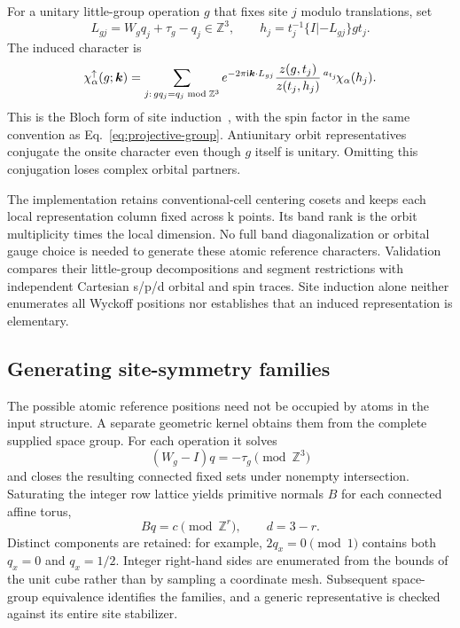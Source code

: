 For a unitary little-group operation $g$ that fixes site $j$ modulo
translations, set
\begin{equation}
 L_{gj}=W_gq_j+\tau_g-q_j\in\mathbb Z^3,\qquad
 h_j=t_j^{-1}\{I|-L_{gj}\}g t_j .
\end{equation}
The induced character is
\begin{equation}
 \chi^{\uparrow}_\alpha(g;\bm{k})=
 \sum_{j:\,gq_j=q_j\bmod\mathbb Z^3}
 e^{-2\pi\mathrm{i}\bm{k}\cdot L_{gj}}
 \frac{z(g,t_j)}{z(t_j,h_j)}\,
 {}^{a_{t_j}}\!\chi_\alpha(h_j).
 \label{eq:atomic-induction}
\end{equation}
This is the Bloch form of site induction~\cite{CanoBradlyn2021}, with
the spin factor in the same convention as Eq.~\eqref{eq:projective-group}.
Antiunitary orbit representatives conjugate the onsite character even
though $g$ itself is unitary. Omitting this conjugation loses complex
orbital partners.

The implementation retains conventional-cell centering cosets and keeps
each local representation column fixed across k points. Its band rank
is the orbit multiplicity times the local dimension. No full band
diagonalization or orbital gauge choice is needed to generate these
atomic reference characters. Validation compares their little-group
decompositions and segment restrictions with independent Cartesian
s/p/d orbital and spin traces. Site induction alone neither enumerates
all Wyckoff positions nor establishes that an induced representation
is elementary.

\subsection{Generating site-symmetry families}
The possible atomic reference positions need not be occupied by atoms
in the input structure. A separate geometric kernel obtains them from
the complete supplied space group. For each operation it solves
\begin{equation}
 (W_g-I)q=-\tau_g\pmod{\mathbb Z^3}
\end{equation}
and closes the resulting connected fixed sets under nonempty
intersection. Saturating the integer row lattice yields primitive
normals $B$ for each connected affine torus,
\begin{equation}
 Bq=c\pmod{\mathbb Z^r},\qquad d=3-r.
\end{equation}
Distinct components are retained: for example, $2q_x=0\pmod1$
contains both $q_x=0$ and $q_x=1/2$. Integer right-hand sides are
enumerated from the bounds of the unit cube rather than by sampling
a coordinate mesh. Subsequent space-group equivalence identifies the
families, and a generic representative is checked against its entire
site stabilizer.

